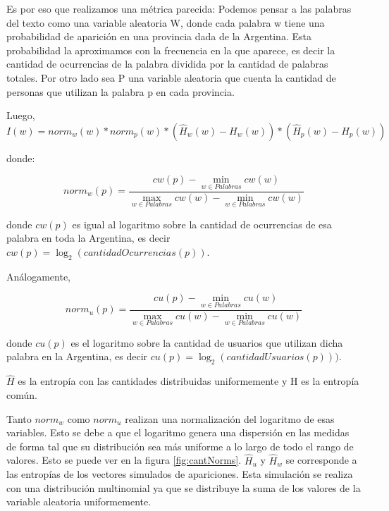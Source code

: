 Es por eso que realizamos una métrica parecida:
Podemos pensar a las palabras del texto como una variable aleatoria W, donde cada palabra w tiene una probabilidad de aparición en una provincia dada de la Argentina. Esta probabilidad la aproximamos con la frecuencia en la que aparece, es decir la cantidad de ocurrencias de la palabra dividida por la cantidad de palabras totales.
Por otro lado sea P una variable aleatoria que cuenta la cantidad de personas que 
utilizan la palabra p en cada provincia.

Luego,
\begin{equation}
I(w) =  norm_{w}(w) * norm_{p}(w) * (\widehat{H}_{w}(w) - H_{w}(w)) * (\widehat{H}_{p}(w) - H_{p}(w))
\end{equation}

donde:

\[ norm_{w}(p) = \frac{cw(p)- \min\limits_{w \in Palabras} cw(w) }{\max\limits_{w \in Palabras} cw(w) - \min\limits_{w \in Palabras} cw(w)} \]

donde $cw(p)$ es igual al logaritmo sobre la cantidad de ocurrencias de esa palabra en toda la Argentina, es decir $cw(p) = \log_2(cantidadOcurrencias(p))$.

Análogamente,

\[
norm_{u}(p) = \frac{cu(p)- \min\limits_{w \in Palabras} cu(w) }{\max\limits_{w \in Palabras} cu(w) - \min\limits_{w \in Palabras} cu(w)}
\] 

donde $cu(p)$ es el logaritmo sobre  la cantidad de usuarios que utilizan dicha palabra en la Argentina, es decir $cu(p)= \log_2(cantidadUsuarios(p)))$.


$\widehat{H}$ es la entropía con las cantidades distribuidas uniformemente y H es la entropía común.

Tanto $norm_{w}$ como $norm_{u}$ realizan una normalización del logaritmo de esas variables. Esto se debe a que el logaritmo genera una dispersión en las medidas de forma tal que su distribución sea más uniforme a lo largo de todo el rango de valores. Esto se puede ver en la figura \ref{fig:cantNorms}.
$\widehat{H}_{u}$ y $\widehat{H}_{w}$ se corresponde a las entropías de los vectores simulados de apariciones.
Esta simulación se realiza con una distribución multinomial ya que se distribuye la suma de los valores de la variable aleatoria uniformemente. 


